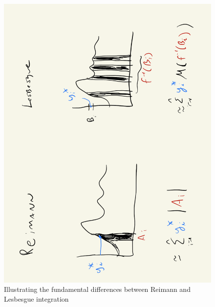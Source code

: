 \documentclass{article} %
\begin{document}
\begin{figure}[H]
\centering 
\includegraphics[width=.7\textwidth, angle=270]{images/lesbesgue_vs_reimann}
\caption{Illustrating the fundamental differences between Reimann and Lesbesgue integration}
\label{fig:lesbesgue_vs_reimann}
\end{figure}
\end{document}
